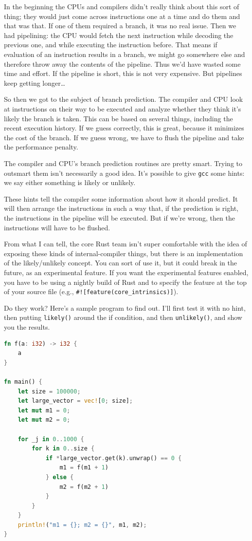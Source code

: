 In the beginning the CPUs and compilers didn't really think about this sort of thing; they would just come across instructions one at a time and do them and that was that. If one of them required a branch, it was no real issue. Then we had pipelining: the CPU would fetch the next instruction while decoding the previous one, and while executing the instruction before. That means if evaluation of an instruction results in a branch, we might go somewhere else and therefore throw away the contents of the pipeline. Thus we'd have wasted some time and effort. If the pipeline is short, this is not very expensive. But pipelines keep getting longer\ldots

So then we got to the subject of branch prediction. The compiler and CPU look at instructions on their way to be executed and analyze whether they think it's likely the branch is taken. This can be based on several things, including the recent execution history. If we guess correctly, this is great, because it minimizes the cost of the branch. If we guess wrong, we have to flush the pipeline and take the performance penalty.

The compiler and CPU's branch prediction routines are pretty smart. Trying to outsmart them isn't necessarily a good idea. It's possible to give \texttt{gcc} some hints: we say either something is likely or unlikely. 

 These hints tell the compiler some information about how it should predict. It will then arrange the instructions in such a way that, if the prediction is right, the instructions in the pipeline will be executed. But if we're wrong, then the instructions will have to be flushed.

From what I can tell, the core Rust team isn't super comfortable with the idea of exposing these kinds of internal-compiler things, but there is an implementation of the likely/unlikely concept. You can sort of use it, but it could break in the future, as an experimental feature. If you want the experimental features enabled, you have to be using a nightly build of Rust and to specify the feature at the top of your source file (e.g., \texttt{\#![feature(core\_intrinsics)]}).

Do they work? Here's a sample program to find out. I'll first test it with no hint, then putting \texttt{likely()} around the if condition, and then \texttt{unlikely()}, and show you the results.

\begin{lstlisting}[language=Rust]
fn f(a: i32) -> i32 {
    a
}

fn main() {
    let size = 100000;
    let large_vector = vec![0; size];
    let mut m1 = 0;
    let mut m2 = 0;

    for _j in 0..1000 {
        for k in 0..size {
            if *large_vector.get(k).unwrap() == 0 {
                m1 = f(m1 + 1)
            } else {
                m2 = f(m2 + 1)
            }
        }
    }
    println!("m1 = {}; m2 = {}", m1, m2);
}
\end{lstlisting}

